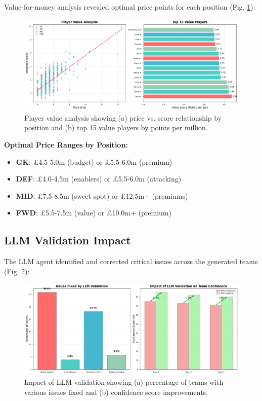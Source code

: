 \documentclass[10pt,a4paper,twocolumn]{article}
\begin{document}
Value-for-money analysis revealed optimal price points for each position (Fig. \ref{fig:value_analysis}):

\begin{figure}[h]
\centering
\includegraphics[width=\columnwidth]{figures/value_analysis.pdf}
\caption{Player value analysis showing (a) price vs. score relationship by position and (b) top 15 value players by points per million.}
\label{fig:value_analysis}
\end{figure}

\textbf{Optimal Price Ranges by Position:}
\begin{itemize}
\item \textbf{GK}: £4.5-5.0m (budget) or £5.5-6.0m (premium)
\item \textbf{DEF}: £4.0-4.5m (enablers) or £5.5-6.0m (attacking)
\item \textbf{MID}: £7.5-8.5m (sweet spot) or £12.5m+ (premiums)
\item \textbf{FWD}: £5.5-7.5m (value) or £10.0m+ (premium)
\end{itemize}

\subsection*{LLM Validation Impact}

The LLM agent identified and corrected critical issues across the generated teams (Fig. \ref{fig:llm_impact}):

\begin{figure}[h]
\centering
\includegraphics[width=\columnwidth]{figures/llm_validation_impact.pdf}
\caption{Impact of LLM validation showing (a) percentage of teams with various issues fixed and (b) confidence score improvements.}
\label{fig:llm_impact}
\end{figure}
\end{document}
